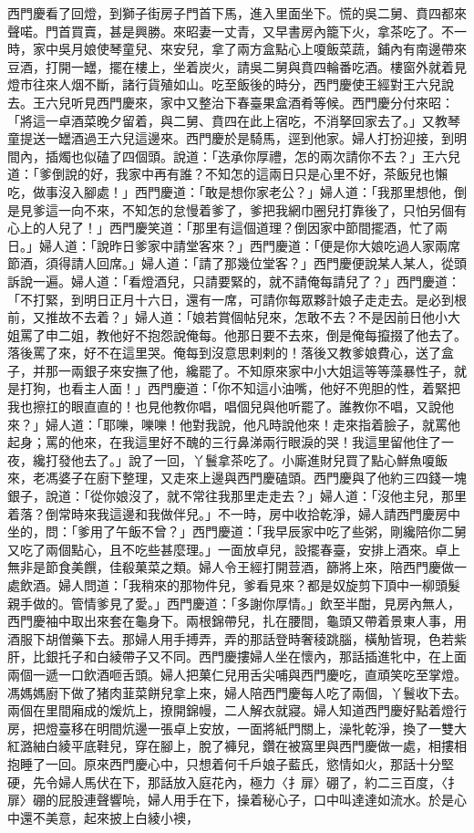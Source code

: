 西門慶看了回燈，到獅子街房子門首下馬，進入里面坐下。慌的吳二舅、賁四都來聲喏。門首買賣，甚是興勝。來昭妻一丈青，又早書房內籠下火，拿茶吃了。不一時，家中吳月娘使琴童兒、來安兒，拿了兩方盒點心上嗄飯菜蔬，鋪內有南邊帶來豆酒，打開一罎，擺在樓上，坐着炭火，請吳二舅與賁四輪番吃酒。樓窗外就着見燈巿往來人烟不斷，諸行貨殖如山。吃至飯後的時分，西門慶使王經對王六兒說去。王六兒听見西門慶來，家中又整治下春臺果盒酒肴等候。西門慶分付來昭：「將這一卓酒菜晚夕留着，與二舅、賁四在此上宿吃，不消拏回家去了。」又教琴童提送一罎酒過王六兒這邊來。西門慶於是騎馬，逕到他家。婦人打扮迎接，到明間內，插燭也似磕了四個頭。說道：「迭承你厚禮，怎的兩次請你不去？」王六兒道：「爹倒說的好，我家中再有誰？不知怎的這兩日只是心里不好，茶飯兒也懶吃，做事沒入腳處！」西門慶道：「敢是想你家老公？」婦人道：「我那里想他，倒是見爹這一向不來，不知怎的怠慢着爹了，爹把我網巾圈兒打靠後了，只怕另個有心上的人兒了！」西門慶笑道：「那里有這個道理？倒因家中節間擺酒，忙了兩日。」婦人道：「說昨日爹家中請堂客來？」西門慶道：「便是你大娘吃過人家兩席節酒，須得請人回席。」婦人道：「請了那幾位堂客？」西門慶便說某人某人，從頭訴說一遍。婦人道：「看燈酒兒，只請要緊的，就不請俺每請兒了？」西門慶道：「不打緊，到明日正月十六日，還有一席，可請你每眾夥計娘子走走去。是必到根前，又推故不去着？」婦人道：「娘若賞個帖兒來，怎敢不去？不是因前日他小大姐罵了申二姐，教他好不抱怨說俺每。他那日要不去來，倒是俺每攛掇了他去了。落後罵了來，好不在這里哭。俺每到沒意思剌剌的！落後又教爹娘費心，送了盒子，并那一兩銀子來安撫了他，纔罷了。不知原來家中小大姐這等等藻暴性子，就是打狗，也看主人面！」西門慶道：「你不知這小油嘴，他好不兜胆的性，着緊把我也擦扛的眼直直的！也見他教你唱，唱個兒與他听罷了。誰教你不唱，又說他來？」婦人道：「耶嚛，嚛嚛！他對我說，他凡時說他來！走來指着臉子，就罵他起身；罵的他來，在我這里好不醜的三行鼻涕兩行眼淚的哭！我這里留他住了一夜，纔打發他去了。」說了一回，丫鬟拿茶吃了。小廝進財兒買了點心鮮魚嗄飯來，老馮婆子在廚下整理，又走來上邊與西門慶磕頭。西門慶與了他約三四錢一塊銀子，說道：「從你娘沒了，就不常往我那里走走去？」婦人道：「沒他主兒，那里着落？倒常時來我這邊和我做伴兒。」不一時，房中收拾乾淨，婦人請西門慶房中坐的，問：「爹用了午飯不曾？」西門慶道：「我早辰家中吃了些粥，剛纔陪你二舅又吃了兩個點心，且不吃些甚麼理。」一面放卓兒，設擺春臺，安排上酒來。卓上無非是節食美饌，佳殽菓菜之類。婦人令王經打開荳酒，篩將上來，陪西門慶做一處飲酒。婦人問道：「我稍來的那物件兒，爹看見來？都是奴旋剪下頂中一柳頭髮親手做的。管情爹見了愛。」西門慶道：「多謝你厚情。」飲至半酣，見房內無人，西門慶袖中取出來套在龜身下。兩根錦帶兒，扎在腰間，龜頭又帶着景東人事，用酒服下胡僧藥下去。那婦人用手搏弄，弄的那話登時奢稜跳腦，橫觔皆現，色若紫肝，比銀托子和白綾帶子又不同。西門慶摟婦人坐在懷內，那話插進牝中，在上面兩個一遞一口飲酒咂舌頭。婦人把菓仁兒用舌尖哺與西門慶吃，直頑笑吃至掌燈。馮媽媽廚下做了猪肉韮菜餅兒拿上來，婦人陪西門慶每人吃了兩個，丫鬟收下去。兩個在里間廂成的煖炕上，撩開錦幔，二人解衣就寢。婦人知道西門慶好點着燈行房，把燈臺移在明間炕邊一張卓上安放，一面將紙門關上，澡牝乾淨，換了一雙大紅潞紬白綾平底鞋兒，穿在腳上，脫了褲兒，鑽在被窩里與西門慶做一處，相摟相抱睡了一回。原來西門慶心中，只想着何千戶娘子藍氏，慾情如火，那話十分堅硬，先令婦人馬伏在下，那話放入庭花內，極力〈扌扉〉硼了，約二三百度，〈扌扉〉硼的屁股連聲響喨，婦人用手在下，操着秘心子，口中叫達達如流水。於是心中還不美意，起來披上白綾小襖，